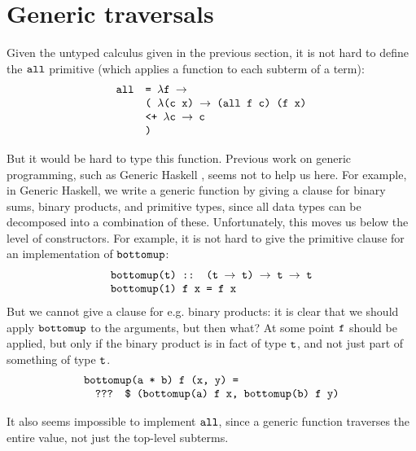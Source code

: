 \documentclass[fleqn]{article}
\newcommand{\ve}[1]{\ensuremath{\text{\tt #1}}}
\newcommand{\ra}{\ensuremath{\rightarrow} }
\begin{document}



\section{Generic traversals}
\label{sec:gentraverse}

Given the untyped calculus given in the previous section, it is not
hard to define the \ve{all} primitive (which applies a function to
each subterm of a term):
\[
\begin{array}{ll}
\ve{all} & \ve{= $\lambda$f \ra} \\
         & \ve{( $\lambda$(c x) \ra (all f c) (f x)} \\
         & \ve{<+ $\lambda$c \ra c} \\
         & \ve{)}
\end{array}
\]

But it would be hard to type this function.  Previous work on generic
programming, such as Generic Haskell \cite{genhaskell}, seems not to
help us here.  For example, in Generic Haskell, we write a generic
function by giving a clause for binary sums, binary products, and
primitive types, since all data types can be decomposed into a
combination of these.  Unfortunately, this moves us below the
level of constructors.  For example, 
it is not hard to give the primitive clause for an implementation of
\ve{bottomup}:
\[
\begin{array}{ll}
\ve{bottomup(t) :: (t \ra t) \ra t \ra t} \\
\ve{bottomup(1) f x = f x}
\end{array}
\]
But we cannot give a clause for e.g. binary products: it is clear that
we should apply \ve{bottomup} to the arguments, but then what?  At
some point \ve{f} should be applied, but only if the binary product is
in fact of type \ve{t}, and not just part of something of type \ve{t}.
\[
\begin{array}{ll}
\ve{bottomup(a * b) f (x, y) =} \\
\quad \ve{??? \$ (bottomup(a) f x, bottomup(b) f y)}
\end{array}
\]

It  also seems impossible to implement \ve{all}, since a generic function
traverses the entire value, not just the top-level subterms.
\end{document}
